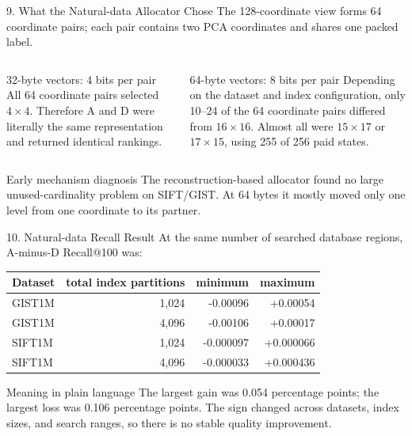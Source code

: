 \documentclass[aspectratio=169]{beamer}
\begin{document}
\begin{frame}{9. What the Natural-data Allocator Chose}
The 128-coordinate view forms 64 coordinate pairs; each pair contains two PCA
coordinates and shares one packed label.
\medskip
\begin{columns}[T]
\begin{block}{32-byte vectors: 4 bits per pair}
All 64 coordinate pairs selected \(4\times4\). Therefore A and D were
literally the same representation and returned identical rankings.
\end{block}
\begin{block}{64-byte vectors: 8 bits per pair}
Depending on the dataset and index configuration, only 10--24 of the 64
coordinate pairs differed from \(16\times16\). Almost all were
\(15\times17\) or \(17\times15\), using 255 of 256 paid states.
\end{block}
\end{columns}
\begin{alertblock}{Early mechanism diagnosis}
The reconstruction-based allocator found no large unused-cardinality problem
on SIFT/GIST. At 64 bytes it mostly moved only one level from one coordinate
to its partner.
\end{alertblock}
\end{frame}

\begin{frame}{10. Natural-data Recall Result}
\small
At the same number of searched database regions, A-minus-D Recall@100 was:
\begin{center}
\begin{tabular}{lrrr}
\toprule
Dataset & total index partitions & minimum & maximum\\
\midrule
GIST1M & 1,024 & -0.00096 & +0.00054\\
GIST1M & 4,096 & -0.00106 & +0.00017\\
SIFT1M & 1,024 & -0.000097 & +0.000066\\
SIFT1M & 4,096 & -0.000033 & +0.000436\\
\bottomrule
\end{tabular}
\end{center}
\begin{alertblock}{Meaning in plain language}
The largest gain was 0.054 percentage points; the largest loss was 0.106
percentage points. The sign changed across datasets, index sizes, and search
ranges, so there is no stable quality improvement.
\end{alertblock}
\end{frame}
\end{document}
